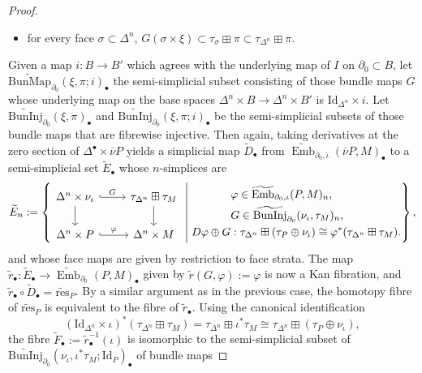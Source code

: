 \documentclass[a4paper, oneside]{amsart}
\newcommand{\bemb}{\widetilde{\operatorname{Emb}}}
\newcommand{\Id}{\mathrm{Id}}
\newcommand{\1}{\mathds{1}}
\theoremstyle{remark}
\theoremstyle{definition}
\numberwithin{equation}{section}
\begin{document}
\begin{proof}
\begin{itemize}
        \item for every face $\sigma\subset \Delta^n$, $G(\sigma\times \xi)\subset \tau_\sigma\boxplus \pi\subset \tau_{\Delta^n}\boxplus \pi$.
    \end{itemize}
    Given a map $i: B\to B'$ which agrees with the underlying map of $I$ on $\partial_0\subset B$, let $\operatorname{\widetilde{BunMap}}_{\partial_0}(\xi,\pi;i)_\bullet$ the semi-simplicial subset consisting of those bundle maps $G$ whose underlying map on the base spaces $\Delta^n\times B\to \Delta^n\times B'$ is $\Id_{\Delta^n}\times i$. Let $\operatorname{\widetilde{BunInj}}_{\partial_0}(\xi,\pi)_\bullet$ and $\operatorname{\widetilde{BunInj}}_{\partial_0}(\xi,\pi;i)_\bullet$ be the semi-simplicial subsets of those bundle maps that are fibrewise injective. Then again, taking derivatives at the zero section of $\Delta^\bullet\times \overline{\nu}P$ yields a simplicial map $\widetilde{D}_\bullet$ from $\bemb_{\partial_0,\hat\iota}(\overline{\nu}P,M)_\bullet$ to a semi-simplicial set $\widetilde{E}_\bullet$ whose $n$-simplices are
    $$
\widetilde{E}_n:=\left\{\begin{tikzcd}
    \Delta^n\times\nu_{\iota}\rar[hook, "G"]\dar & \tau_{\Delta^n}\boxplus\tau_M\dar\\
    \Delta^n\times P\rar[hook, "\varphi"] &\Delta^n\times M
\end{tikzcd}\;\middle|\;
\begin{aligned}
    &\varphi\in\bemb_{\partial_0,\iota}(P,M)_n,\\
    &G\in \operatorname{\widetilde{BunInj}}_{\partial_0}(\nu_\iota,\tau_M)_n,\\
    D\varphi\oplus G&: \tau_{\Delta^n}\boxplus(\tau_P\oplus\nu_{\iota})\cong \varphi^*(\tau_{\Delta^n}\boxplus\tau_M).
\end{aligned}
\right\},
    $$
    and whose face maps are given by restriction to face strata. The map $\widetilde{r}_\bullet:\widetilde{E}_\bullet\to \bemb_{\partial_0}(P,M)_\bullet$ given by $\widetilde{r}(G,\varphi):=\varphi$ is now a Kan fibration, and $\widetilde{r}_\bullet\circ\widetilde{D}_\bullet=\widetilde{\mathrm{res}}_P$. By a similar argument as in the previous case, the homotopy fibre of $\widetilde{\mathrm{res}}_P$ is equivalent to the fibre of $\widetilde{r}_\bullet$. Using the canonical identification
    $$
(\Id_{\Delta^n}\times\iota)^*(\tau_{\Delta^n}\boxplus \tau_M)=\tau_{\Delta^n}\boxplus\iota^*\tau_M\cong \tau_{\Delta^n}\boxplus(\tau_P\oplus\nu_\iota),
    $$
    the fibre $\widetilde{F}_\bullet:=\widetilde{r}^{-1}_\bullet(\iota)$ is isomorphic to the semi-simplicial subset of $\operatorname{\widetilde{BunInj}}_{\partial_0}(\nu_\iota, \iota^*\tau_M; \Id_P)_\bullet$ of bundle maps 

\end{proof}
\end{document}
